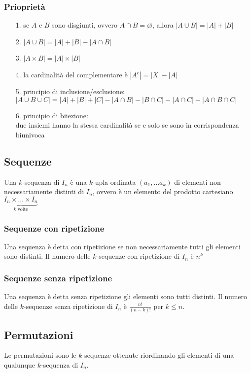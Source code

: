 \documentclass[a4paper]{article}
\begin{document}
\subsubsection*{Prioprietà}
\begin{itemize}[topsep=3pt, itemsep=0pt]
	\item[1.] se \(A\) e \(B\) sono disgiunti, ovvero \(A \cap B = \varnothing\), allora \(|A \cup B| = |A| + |B|\)
	\item[2.] \(|A\cup B| = |A| + |B| - |A \cap B|\)
	\item[3.] \(|A \times B| = |A| \times |B|\)
	\item[4.] la cardinalità del complementare è \(|A^c| = |X|-|A|\)
	\item[5.] principio di inclusione/esclusione: \\
	\(|A \cup B \cup C| = |A| + |B| + |C| - |A \cap B| - |B \cap C| - |A \cap C| + |A \cap B \cap C|\)
	\item[6.] principio di biiezione: \\
	due insiemi hanno la stessa cardinalità se e solo se sono in corrispondenza biunivoca
\end{itemize}

\subsection{Sequenze}
Una \(k\)-sequenza di \(I_n\) è una \(k\)-upla ordinata \((a_1, \dots a_k)\) di elementi non necessariamente distinti di \(I_n\),
ovvero è un elemento del prodotto cartesiano \(\underbrace{I_n \times \dots \times I_n}_{k \; \text{volte}}\)

\subsubsection*{Sequenze con ripetizione}
Una sequenza è detta con ripetizione se non necessariamente tutti gli elementi sono distinti. Il numero delle \(k\)-sequenze con
ripetizione di \(I_n\) è \(n^k\)

\subsubsection*{Sequenze senza ripetizione}
Una sequenza è detta senza ripetizione gli elementi sono tutti distinti. Il numero delle \(k\)-sequenze senza ripetizione di \(I_n\)
è \(\displaystyle \frac{n!}{(n-k)!}\) per \(k \leq n\).

\subsection{Permutazioni}
Le permutazioni sono le \(k\)-sequenze ottenute riordinando gli elementi di una qualunque \(k\)-sequenza di \(I_n\).
\end{document}
